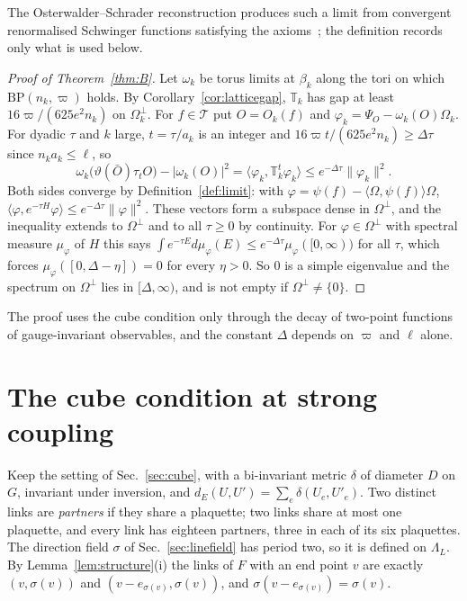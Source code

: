 \documentclass[11pt]{amsart}
\theoremstyle{definition}
\theoremstyle{remark}
\numberwithin{equation}{section}
\newcommand{\ip}[2]{\langle #1,#2\rangle}
\newcommand{\BP}{\mathrm{BP}}
\begin{document}
The Osterwalder--Schrader reconstruction produces such a limit from
convergent renormalised Schwinger functions satisfying the
axioms~\cite{OS73,OS75}; the definition records only what is used below.

\begin{proof}[Proof of Theorem~\ref{thm:B}]
Let $\omega_k$ be torus limits at $\beta_k$ along the tori on which
$\BP(n_k,\varpi)$ holds. By Corollary~\ref{cor:latticegap}, $\mathbb T_k$ has gap
at least $16\varpi/(625e^2n_k)$ on $\Omega_k^\perp$. For $f\in\mathcal T$ put
$O=O_k(f)$ and $\varphi_k=\Psi_O-\omega_k(O)\Omega_k$. For dyadic $\tau$ and $k$
large, $t=\tau/a_k$ is an integer and $16\varpi t/(625e^2n_k)\ge\Delta\tau$ since
$n_ka_k\le\ell$, so
\[
\omega_k\bigl(\vartheta(\bar O)\tau_tO\bigr)-|\omega_k(O)|^2=\ip{\varphi_k}{\mathbb T_k^t
\varphi_k}\le e^{-\Delta\tau}\|\varphi_k\|^2 .
\]
Both sides converge by Definition~\ref{def:limit}: with $\varphi=\psi(f)-\ip\Omega
{\psi(f)}\Omega$, $\ip\varphi{e^{-\tau H}\varphi}\le e^{-\Delta\tau}\|\varphi\|^2$. These
vectors form a subspace dense in $\Omega^\perp$, and the inequality extends to
$\Omega^\perp$ and to all $\tau\ge0$ by continuity. For $\varphi\in\Omega^\perp$ with
spectral measure $\mu_\varphi$ of $H$ this says $\int e^{-\tau E}d\mu_\varphi(E)\le e^{-\Delta
\tau}\mu_\varphi([0,\infty))$ for all $\tau$, which forces $\mu_\varphi([0,\Delta-\eta])=0$
for every $\eta>0$. So $0$ is a simple eigenvalue and the spectrum on
$\Omega^\perp$ lies in $[\Delta,\infty)$, and is not empty if $\Omega^\perp\ne\{0\}$.
\end{proof}

The proof uses the cube condition only through the decay of two-point
functions of gauge-invariant observables, and the constant $\Delta$ depends on
$\varpi$ and $\ell$ alone.
\section{The cube condition at strong coupling}\label{sec:bpstrong}

Keep the setting of Sec.~\ref{sec:cube}, with a bi-invariant metric $\delta$
of diameter $D$ on $G$, invariant under inversion, and $d_E(U,U')=\sum_e
\delta(U_e,U'_e)$. Two distinct links are \emph{partners} if they share a
plaquette; two links share at most one plaquette, and every link has eighteen
partners, three in each of its six plaquettes. The direction field $\sigma$ of
Sec.~\ref{sec:linefield} has period two, so it is defined on $\Lambda_L$. By
Lemma~\ref{lem:structure}(i) the links of $F$ with an end point $v$ are exactly
$(v,\sigma(v))$ and $(v-e_{\sigma(v)},\sigma(v))$, and $\sigma(v-e_{\sigma(v)})=
\sigma(v)$.
\end{document}
